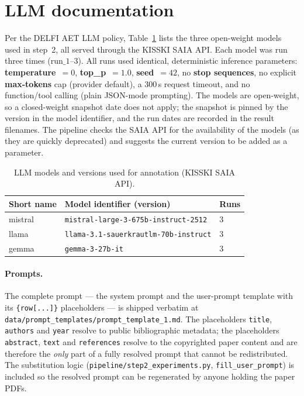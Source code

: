 \documentclass[english,biblatex]{lni}
\begin{document}
\section{LLM documentation}
Per the DELFI AET LLM policy, Table~\ref{tab:llms} lists the three open-weight
models used in step~2, all served through the KISSKI SAIA API. Each model was run
three times ($\mathrm{run}\_1$--$3$). All runs used identical, deterministic
inference parameters: \textbf{temperature}~$=0$, \textbf{top\_p}~$=1.0$,
\textbf{seed}~$=42$, no \textbf{stop sequences}, no explicit \textbf{max-tokens}
cap (provider default), a 300\,s request timeout, and no function/tool calling
(plain JSON-mode prompting). The models are open-weight, so a closed-weight
snapshot date does not apply; the snapshot is pinned by the version in the model
identifier, and the run dates are recorded in the result filenames. The pipeline checks the SAIA API for
the availability of the models (as they are quickly deprecated) and suggests the current version to be
added as a parameter.

\begin{table}[h]
\centering
\caption{LLM models and versions used for annotation (KISSKI SAIA API).}
\label{tab:llms}
\begin{tabular}{lll}
\toprule
Short name & Model identifier (version) & Runs \\
\midrule
mistral & \texttt{mistral-large-3-675b-instruct-2512} & 3 \\
llama   & \texttt{llama-3.1-sauerkrautlm-70b-instruct} & 3 \\
gemma   & \texttt{gemma-3-27b-it} & 3 \\
\bottomrule
\end{tabular}
\end{table}

\paragraph{Prompts.} The complete prompt --- the system prompt and the user-prompt
template with its \texttt{\{row[...]\}} placeholders --- is shipped verbatim at
\texttt{data/prompt\_templates/prompt\_template\_1.md}. The placeholders
\texttt{title}, \texttt{authors} and \texttt{year} resolve to public bibliographic
metadata; the placeholders \texttt{abstract}, \texttt{text} and \texttt{references}
resolve to the copyrighted paper content and are therefore the \emph{only} part of
a fully resolved prompt that cannot be redistributed. The substitution logic
(\texttt{pipeline/step2\_experiments.py}, \texttt{fill\_user\_prompt}) is included so
the resolved prompt can be regenerated by anyone holding the paper PDFs.
\end{document}
